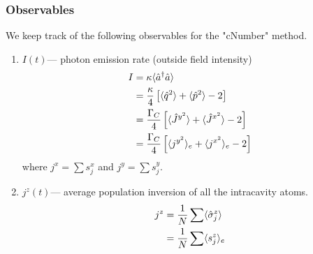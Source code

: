 \documentclass{article}
\newcommand{\gc}{\Gamma_C}
\begin{document}



\subsubsection{Observables}
We keep track of the following observables for the "cNumber" method. 
\begin{enumerate}
    \item  $I(t)$\---- photon emission rate (outside field intensity)
        \begin{align}
            \notag I &= \kappa \langle \hat{a}^\dagger \hat{a} \rangle\\
            \notag   &= \frac{\kappa}{4}\left[\langle \hat{q}^2\rangle+\langle\hat{p}^2\rangle-2\right]\\
            \notag   &= \frac{\gc}{4} \left[\langle \hat{J}^{y^2}\rangle+\langle\hat{J}^{x^2}\rangle-2\right]\\
                     &= \frac{\gc}{4}\left[\langle j^{y^2} \rangle_e+\langle j^{x^2} \rangle_e-2\right]
        \end{align}
        where $j^x=\sum s^x_j$ and $j^y=\sum s^y_j$.
    \item $j^z(t)$\---- average population inversion of all the intracavity atoms.
        \begin{align}
            \notag j^z &= \frac{1}{N}\sum \langle \hat{\sigma}^z _j\rangle\\
                       &= \frac{1}{N}\sum \langle s_j^z\rangle_e
        \end{align}
        

\end{enumerate}
\end{document}
